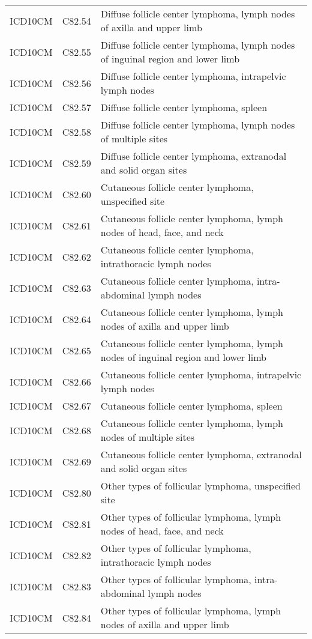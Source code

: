 \begin{longtable}{p{}p{}p{}}
  ICD10CM & C82.54 & Diffuse follicle center lymphoma, lymph nodes of axilla and upper limb \\ 
  ICD10CM & C82.55 & Diffuse follicle center lymphoma, lymph nodes of inguinal region and lower limb \\ 
  ICD10CM & C82.56 & Diffuse follicle center lymphoma, intrapelvic lymph nodes \\ 
  ICD10CM & C82.57 & Diffuse follicle center lymphoma, spleen \\ 
  ICD10CM & C82.58 & Diffuse follicle center lymphoma, lymph nodes of multiple sites \\ 
  ICD10CM & C82.59 & Diffuse follicle center lymphoma, extranodal and solid organ sites \\ 
  ICD10CM & C82.60 & Cutaneous follicle center lymphoma, unspecified site \\ 
  ICD10CM & C82.61 & Cutaneous follicle center lymphoma, lymph nodes of head, face, and neck \\ 
  ICD10CM & C82.62 & Cutaneous follicle center lymphoma, intrathoracic lymph nodes \\ 
  ICD10CM & C82.63 & Cutaneous follicle center lymphoma, intra-abdominal lymph nodes \\ 
  ICD10CM & C82.64 & Cutaneous follicle center lymphoma, lymph nodes of axilla and upper limb \\ 
  ICD10CM & C82.65 & Cutaneous follicle center lymphoma, lymph nodes of inguinal region and lower limb \\ 
  ICD10CM & C82.66 & Cutaneous follicle center lymphoma, intrapelvic lymph nodes \\ 
  ICD10CM & C82.67 & Cutaneous follicle center lymphoma, spleen \\ 
  ICD10CM & C82.68 & Cutaneous follicle center lymphoma, lymph nodes of multiple sites \\ 
  ICD10CM & C82.69 & Cutaneous follicle center lymphoma, extranodal and solid organ sites \\ 
  ICD10CM & C82.80 & Other types of follicular lymphoma, unspecified site \\ 
  ICD10CM & C82.81 & Other types of follicular lymphoma, lymph nodes of head, face, and neck \\ 
  ICD10CM & C82.82 & Other types of follicular lymphoma, intrathoracic lymph nodes \\ 
  ICD10CM & C82.83 & Other types of follicular lymphoma, intra-abdominal lymph nodes \\ 
  ICD10CM & C82.84 & Other types of follicular lymphoma, lymph nodes of axilla and upper limb \\ 

\end{longtable}
